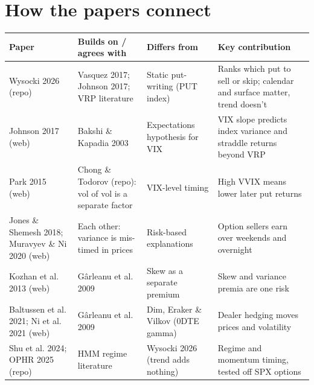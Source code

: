 \documentclass{article}
\begin{document}
\section{How the papers connect}

\begin{center}\small
\begin{tabularx}{\linewidth}{>{\raggedright\arraybackslash}X >{\raggedright\arraybackslash}X >{\raggedright\arraybackslash}X >{\raggedright\arraybackslash}X}
\toprule
\textbf{Paper} & \textbf{Builds on /\allowbreak{} agrees with} & \textbf{Differs from} & \textbf{Key contribution} \\
\midrule
Wysocki 2026 (repo) & Vasquez 2017; Johnson 2017; VRP literature & Static put-writing (PUT index) & Ranks which put to sell or skip; calendar and surface matter, trend doesn't \\
Johnson 2017 (web) & Bakshi \& Kapadia 2003 & Expectations hypothesis for VIX & VIX slope predicts index variance and straddle returns beyond VRP \\
Park 2015 (web) & Chong \& Todorov (repo): vol of vol is a separate factor & VIX-level timing & High VVIX means lower later put returns \\
Jones \& Shemesh 2018; Muravyev \& Ni 2020 (web) & Each other: variance is mis-timed in prices & Risk-based explanations & Option sellers earn over weekends and overnight \\
Kozhan et al. 2013 (web) & Gârleanu et al. 2009 & Skew as a separate premium & Skew and variance premia are one risk \\
Baltussen et al. 2021; Ni et al. 2021 (web) & Gârleanu et al. 2009 & Dim, Eraker \& Vilkov (0DTE gamma) & Dealer hedging moves prices and volatility \\
Shu et al. 2024; OPHR 2025 (repo) & HMM regime literature & Wysocki 2026 (trend adds nothing) & Regime and momentum timing, tested off SPX options \\
\bottomrule
\end{tabularx}
\end{center}
\end{document}
